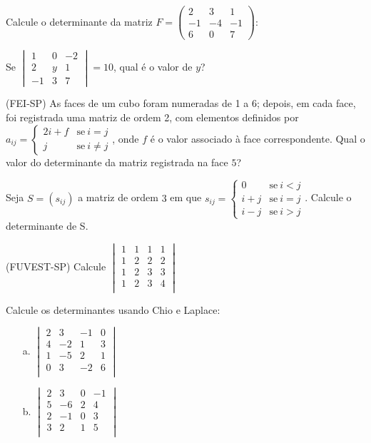 \documentclass[pdftex, brazil, 12pt, oneside, addpoints]{exam}
\begin{document}
\begin{questions}
\question
Calcule o determinante da matriz
$F = \begin{pmatrix}
   2 &  3 &  1\\
  -1 & -4 & -1\\
   6 &  0 & 7
\end{pmatrix}$:

\question
Se
$\begin{vmatrix}
  1 & 0 & -2\\
  2 & y &  1\\
 -1 & 3 & 7
\end{vmatrix} = 10$, qual é o valor de $y$?

\ifprintanswers
\else
\newpage
\fi

\question
(FEI-SP) As faces de um cubo foram numeradas de 1 a 6; depois, em cada face, foi
registrada uma matriz de ordem 2, com elementos definidos por
$a_{ij} =
    \begin{cases}
      2i + f & \text{se}\ i = j\\
      j      & \text{se}\ i \ne j
    \end{cases}
$, onde $f$ é o valor associado à face correspondente. Qual o valor do determinante
da matriz registrada na face $5$?

\question
Seja $S = (s_{ij})$ a matriz de ordem $3$ em que
$s_{ij} =
\begin{cases}
  0     & \text{se}\ i < j\\
  i + j & \text{se}\ i = j\\
  i - j & \text{se}\ i > j
\end{cases}
$. Calcule o determinante de S.

\question
(FUVEST-SP) Calcule
$\begin{vmatrix}
  1 & 1 & 1 & 1\\
  1 & 2 & 2 & 2\\
  1 & 2 & 3 & 3\\
  1 & 2 & 3 & 4\\
\end{vmatrix}$

\question
Calcule os determinantes usando Chio e Laplace:
\begin{itemize}
\item[a.]
$\begin{vmatrix}
  2 &  3 & -1 & 0\\
  4 & -2 &  1 & 3\\
  1 & -5 &  2 & 1\\
  0 &  3 & -2 & 6\\
\end{vmatrix}$  
\item[b.]
$\begin{vmatrix}
  2 &  3 & 0 & -1\\
  5 & -6 & 2 &  4\\
  2 & -1 & 0 &  3\\
  3 &  2 & 1 &  5\\
\end{vmatrix}$
\end{itemize}



\end{questions}
\end{document}
